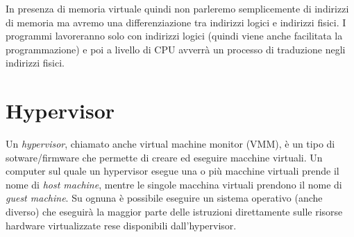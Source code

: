 In presenza di memoria virtuale quindi non parleremo semplicemente di indirizzi di memoria ma avremo una differenziazione tra indirizzi logici e indirizzi fisici. I programmi lavoreranno solo con indirizzi logici (quindi viene anche facilitata la programmazione) e poi a livello di CPU avverrà un processo di traduzione negli indirizzi fisici.

\section{Hypervisor}
Un \textit{hypervisor}, chiamato anche virtual machine monitor (VMM), è un tipo di sotware/firmware che permette di creare ed eseguire macchine virtuali. Un computer sul quale un hypervisor esegue una o più macchine virtuali prende il nome di \textit{host machine}, mentre le singole macchina virtuali prendono il nome di \textit{guest machine}. Su ognuna è possibile eseguire un sistema operativo (anche diverso) che eseguirà la maggior parte delle istruzioni direttamente sulle risorse hardware virtualizzate rese disponibili dall'hypervisor.